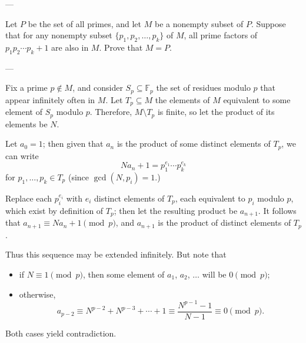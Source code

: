 
---

Let $P$ be the set of all primes, and let $M$ be a nonempty subset of $P$. Suppose that for any nonempty subset $\{p_1,p_2,\ldots,p_k\}$ of $M$, all prime factors of $p_1p_2\cdots p_k+1$ are also in $M$. Prove that $M=P$.

---

Fix a prime $p\notin M$, and consider $S_p\subseteq\mathbb F_p$ the set of residues modulo $p$ that appear infinitely often in $M$. Let $T_p\subseteq M$ the elements of $M$ equivalent to some element of $S_p$ modulo $p$. Therefore, $M\setminus T_p$ is finite, so let the product of its elements be $N$.

Let $a_0=1$; then given that $a_n$ is the product of some distinct elements of $T_p$, we can write
\[Na_n+1=p_1^{e_1}\cdots p_k^{e_k}\]
for $p_1,\ldots,p_k\in T_p$ (since $\gcd(N,p_i)=1$.)

Replace each $p_i^{e_i}$ with $e_i$ distinct elements of $T_p$, each equivalent to $p_i$ modulo $p$, which exist by definition of $T_p$; then let the resulting product be $a_{n+1}$. It follows that $a_{n+1}\equiv Na_n+1\pmod p$, and $a_{n+1}$ is the product of distinct elements of $T_p$.

Thus this sequence may be extended infinitely. But note that
\begin{itemize}
    \item if $N\equiv1\pmod p$, then some element of $a_1$, $a_2$, $\ldots$ will be $0\pmod p$;
    \item otherwise, 
        \[a_{p-2}\equiv N^{p-2}+N^{p-3}+\cdots+1\equiv\frac{N^{p-1}-1}{N-1}\equiv0\pmod p.\]
\end{itemize}
Both cases yield contradiction.

